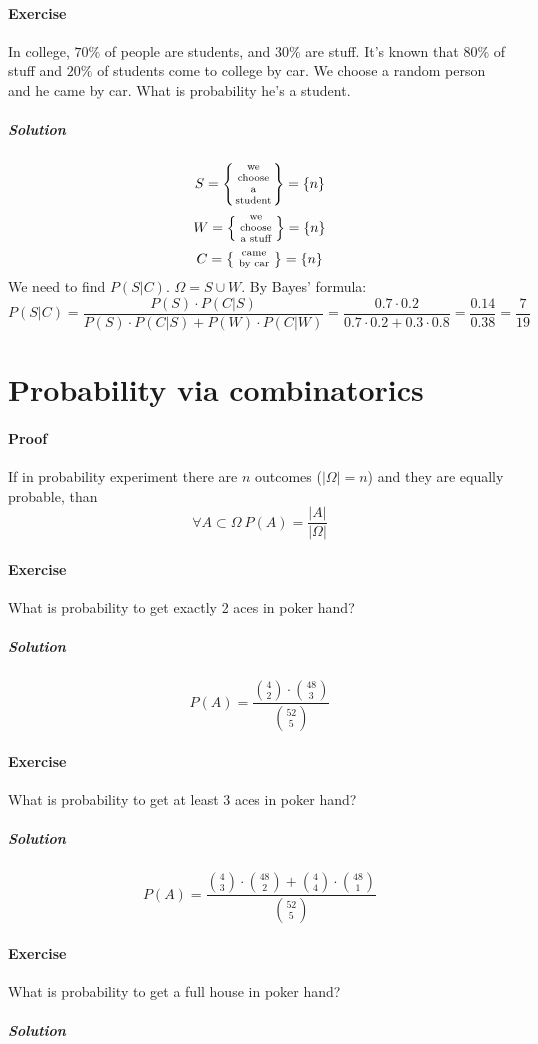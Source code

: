 \paragraph{Exercise} In college, $70\%$ of people are students, and $30\%$ are stuff. It's known that $80\%$ of stuff and $20\%$ of students come to college by car. We choose a random person and he came by car. What is probability he's a student.
\subparagraph{Solution}
$$S = \left\{ \parbox{1cm}{\centering \scriptsize we choose a student } \right\} = \left\{ n \right\}$$
$$W = \left\{ \parbox{1cm}{\centering \scriptsize we choose a stuff } \right\} = \left\{ n \right\}$$
$$C = \left\{ \parbox{1cm}{\centering \scriptsize came by car } \right\} = \left\{ n \right\}$$
We need to find $P(S|C)$.
$\Omega = S \cup W$. By Bayes' formula:
$$P(S|C) = \frac{P(S) \cdot P(C|S)}{P(S)\cdot P(C|S) + P(W)\cdot P(C|W)} = \frac{0.7 \cdot 0.2}{0.7\cdot 0.2 + 0.3 \cdot 0.8} = \frac{0.14}{0.38} = \frac{7}{19}$$

\section{Probability via combinatorics}
\paragraph{Proof} If in probability experiment there are $n$ outcomes ($|\Omega| = n$) and they are equally probable, than $$\forall A \subset \Omega \: P(A) = \frac{|A|}{|\Omega|}$$

\paragraph{Exercise} What is probability to get exactly 2 aces in poker hand?
\subparagraph{Solution}

$$P(A) = \frac{\binom{4}{2} \cdot \binom{48}{3}}{\binom{52}{5}}$$
\paragraph{Exercise} What is probability to get at least 3 aces in poker hand?
\subparagraph{Solution}

$$P(A) = \frac{\binom{4}{3} \cdot \binom{48}{2} +\binom{4}{4} \cdot \binom{48}{1} }{\binom{52}{5}}$$
\paragraph{Exercise} What is probability to get a full house in poker hand?
\subparagraph{Solution}

